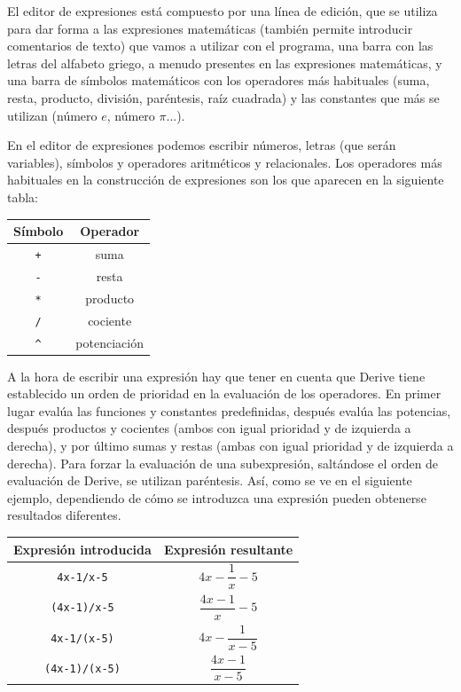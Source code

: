 El editor de expresiones está compuesto por una línea de edición,
que se utiliza para dar forma a las expresiones matemáticas (también
permite introducir comentarios de texto) que vamos a utilizar con el
programa, una barra con las letras del alfabeto griego, a menudo
presentes en las expresiones matemáticas, y una barra de símbolos
matemáticos con los operadores más habituales (suma, resta,
producto, división, paréntesis, raíz cuadrada) y las constantes que
más se utilizan (número $e$, número $\pi$...).

En el editor de expresiones podemos escribir números, letras (que
serán variables), símbolos y operadores aritméticos y relacionales.
Los operadores más habituales en la construcción de expresiones son
los que aparecen en la siguiente tabla:

\begin{center}
\begin{tabular}{|c|c|}
\hline
 Símbolo &   Operador   \\
\hline\hline
    \texttt{+}    &     suma     \\
\hline
    \texttt{-}    &    resta     \\
\hline
    \texttt{*}    &   producto   \\
\hline
    \texttt{/}    &   cociente   \\
\hline
   \texttt{\^{}}    & potenciación \\
\hline
\end{tabular}
\end{center}

A la hora de escribir una expresión hay que tener en cuenta que
Derive tiene establecido un orden de prioridad en la evaluación de
los operadores. En primer lugar evalúa las funciones y constantes
predefinidas, después evalúa las potencias, después productos y
cocientes (ambos con igual prioridad y de izquierda a derecha), y
por último sumas y restas (ambas con igual prioridad y de izquierda
a derecha). Para forzar la evaluación de una subexpresión,
saltándose el orden de evaluación de Derive, se utilizan paréntesis.
Así, como se ve en el siguiente ejemplo, dependiendo de cómo se
introduzca una expresión pueden obtenerse resultados diferentes.

\begin{center}\renewcommand{\arraystretch}{2}
\begin{tabular}{|c|c|}
\hline
  Expresión introducida & Expresión resultante \\
\hline\hline
        \texttt{4x-1/x-5}        & $4x-\dfrac{1}{x}-5$ \\
\hline
       \texttt{(4x-1)/x-5}       & $\dfrac{4x-1}{x}-5$  \\
\hline
       \texttt{4x-1/(x-5)}       & $4x-\dfrac{1}{x-5}$  \\
\hline
      \texttt{(4x-1)/(x-5)}      & $\dfrac{4x-1}{x-5}$  \\
\hline
\end{tabular}
\end{center}

